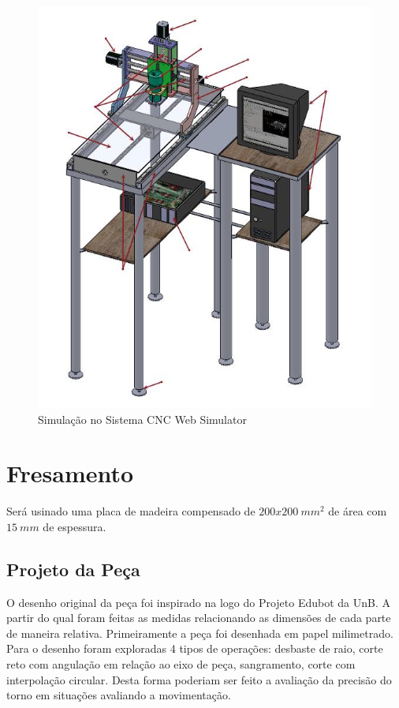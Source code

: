 \documentclass[a4paper,11pt]{article}
\begin{document}
\begin{figure}[H]
    \centering
    \includegraphics[width = 0.6\linewidth]{img/relat2/routerCNC}
    \caption{Simulação no Sistema CNC Web Simulator}
    \label{fig:vela-simCNCWebSimulator}
\end{figure}


\section{Fresamento}
 Será usinado uma placa de madeira compensado de $200x200\ mm^2$ de área com $15\ mm$ de espessura.

\subsection{Projeto da Peça}
O desenho original da peça foi inspirado na logo do Projeto Edubot da UnB. A partir do qual foram feitas as medidas relacionando as dimensões de cada parte de maneira relativa. Primeiramente a peça foi desenhada em papel milimetrado. Para o desenho foram exploradas 4 tipos de operações: desbaste de raio, corte reto com angulação em relação ao eixo de peça, sangramento, corte com interpolação circular. Desta forma poderiam ser feito a avaliação da precisão do torno em situações avaliando a movimentação.
\end{document}
